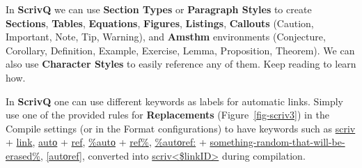 \documentclass[
  12pt,
  a4paper,
  oneside,
  numbers=noenddot,
  titlepage,
  toclink=all,
  toc=bibliography]{scrbook}
\theoremstyle{definition}
\theoremstyle{definition}
\theoremstyle{definition}
\theoremstyle{plain}
\theoremstyle{plain}
\theoremstyle{plain}
\theoremstyle{plain}
\theoremstyle{plain}
\theoremstyle{remark}
\begin{document}
\begin{tcolorbox}[enhanced jigsaw, titlerule=0mm, left=2mm, toptitle=1mm, colback=white, coltitle=black, rightrule=.15mm, arc=.35mm, title=\textcolor{quarto-callout-note-color}{\faInfo}\hspace{0.5em}{Translating Quarto into Scrivener}, colframe=quarto-callout-note-color-frame, bottomrule=.15mm, colbacktitle=quarto-callout-note-color!10!white, toprule=.15mm, breakable, bottomtitle=1mm, opacityback=0, opacitybacktitle=0.6, leftrule=.75mm]

In \textbf{ScrivQ} we can use \textbf{Section Types} or
\textbf{Paragraph Styles} to create \textbf{Sections}, \textbf{Tables},
\textbf{Equations}, \textbf{Figures}, \textbf{Listings},
\textbf{Callouts} (Caution, Important, Note, Tip, Warning), and
\textbf{Amsthm} environments (Conjecture, Corollary, Definition,
Example, Exercise, Lemma, Proposition, Theorem). We can also use
\textbf{Character Styles} to easily reference any of them. Keep reading
to learn how.

\end{tcolorbox}

\begin{tcolorbox}[enhanced jigsaw, titlerule=0mm, left=2mm, toptitle=1mm, colback=white, coltitle=black, rightrule=.15mm, arc=.35mm, title=\textcolor{quarto-callout-tip-color}{\faLightbulb}\hspace{0.5em}{Choosing your own label for automatic links}, colframe=quarto-callout-tip-color-frame, bottomrule=.15mm, colbacktitle=quarto-callout-tip-color!10!white, toprule=.15mm, breakable, bottomtitle=1mm, opacityback=0, opacitybacktitle=0.6, leftrule=.75mm]

In \textbf{ScrivQ} one can use different keywords as labels for
automatic links. Simply use one of the provided rules for
\textbf{Replacements}
(\protect\hypertarget{cite_5}{}{\label{cite_5}Figure~\ref{fig-scriv3}})
in the Compile settings (or in the Format configurations) to have
keywords such as \ul{scriv} + \ul{link}, \ul{autο} + \ul{ref},
\ul{\%autο} + \ul{ref\%}, \ul{\%autοref:} +
\ul{something-random-that-will-be-erased\%}, \ul{{[}autοref{]}},
converted into \ul{scriv\textless\$linkID\textgreater{}} during
compilation.

\end{tcolorbox}
\end{document}
